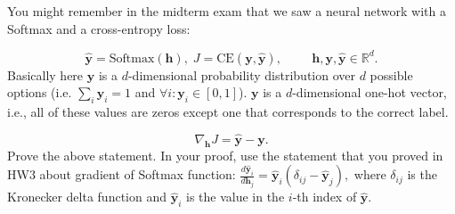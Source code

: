 You might remember in the midterm exam that we saw a neural network with a Softmax and a cross-entropy loss: 

$$ 
\hat{\textbf{y}} = \text{Softmax}(\textbf{h}),\; J = \text{CE}(\mathbf{y}, \hat{\mathbf{y}}), \hspace{1cm} \textbf{h}, \mathbf{y}, \hat{\mathbf{y}} \in \mathbb{R}^d.
$$
Basically here $\hat{\mathbf{y}}$ is a $d$-dimensional probability distribution over $d$ possible options (i.e. 
$\sum_i  \mathbf{y}_i = 1$ and $\forall i: \mathbf{y}_i \in [0, 1]$). 
$\mathbf{y}$ is a $d$-dimensional one-hot vector, i.e., all of these values are zeros except one that corresponds to the correct label. 

$$
\nabla_\mathbf{h} J = \hat{\mathbf{y}} - \mathbf{y}.
$$
Prove the above statement. 
In your proof, use the statement that you proved in HW3 about gradient of Softmax function: 
$\frac{ d \hat{\textbf{y}}_i }{ d \textbf{h}_j } = \hat{\textbf{y}}_i (\delta_{ij} - \hat{\textbf{y}}_j),$
        where $\delta_{ij}$ is the Kronecker delta function and $\hat{\textbf{y}}_i$ is the value in the $i$-th index of $\hat{\textbf{y}}$. \\ 

